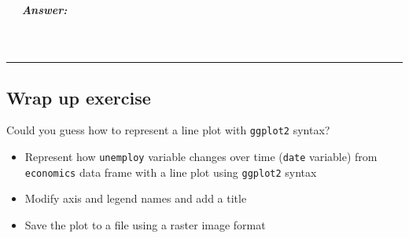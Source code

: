 \documentclass[
]{article}
\providecommand{\tightlist}{%
  \setlength{\itemsep}{0pt}\setlength{\parskip}{0pt}}
\begin{document}
\subparagraph{  Answer:}\label{answer-9}

 

\begin{center}\rule{0.5\linewidth}{0.5pt}\end{center}

\subsection{\texorpdfstring{ Wrap up
exercise}{ Wrap up exercise}}\label{wrap-up-exercise}

Could you guess how to represent a line plot with \texttt{ggplot2}
syntax?

\begin{itemize}
\tightlist
\item
  Represent how \texttt{unemploy} variable changes over time
  (\texttt{date} variable) from \texttt{economics} data frame with a
  line plot using \texttt{ggplot2} syntax
\item
  Modify axis and legend names and add a title
\item
  Save the plot to a file using a raster image format
\end{itemize}
\end{document}
